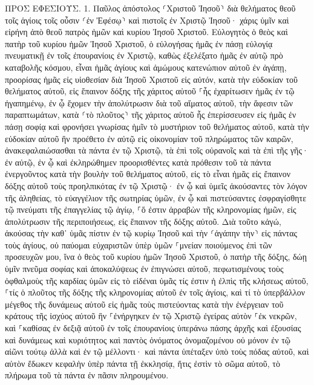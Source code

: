 \documentclass[twoside, 9pt]{extreport}
\begin{document}
ΠΡΟΣ ΕΦΕΣΙΟΥΣ.
1.
Παῦλος ἀπόστολος ⸂Χριστοῦ Ἰησοῦ⸃ διὰ θελήματος θεοῦ τοῖς ἁγίοις τοῖς οὖσιν ⸂ἐν Ἐφέσῳ⸃ καὶ πιστοῖς ἐν Χριστῷ Ἰησοῦ· 
χάρις ὑμῖν καὶ εἰρήνη ἀπὸ θεοῦ πατρὸς ἡμῶν καὶ κυρίου Ἰησοῦ Χριστοῦ. 
Εὐλογητὸς ὁ θεὸς καὶ πατὴρ τοῦ κυρίου ἡμῶν Ἰησοῦ Χριστοῦ, ὁ εὐλογήσας ἡμᾶς ἐν πάσῃ εὐλογίᾳ πνευματικῇ ἐν τοῖς ἐπουρανίοις ἐν Χριστῷ, 
καθὼς ἐξελέξατο ἡμᾶς ἐν αὐτῷ πρὸ καταβολῆς κόσμου, εἶναι ἡμᾶς ἁγίους καὶ ἀμώμους κατενώπιον αὐτοῦ ἐν ἀγάπῃ, 
προορίσας ἡμᾶς εἰς υἱοθεσίαν διὰ Ἰησοῦ Χριστοῦ εἰς αὐτόν, κατὰ τὴν εὐδοκίαν τοῦ θελήματος αὐτοῦ, 
εἰς ἔπαινον δόξης τῆς χάριτος αὐτοῦ ⸀ἧς ἐχαρίτωσεν ἡμᾶς ἐν τῷ ἠγαπημένῳ, 
ἐν ᾧ ἔχομεν τὴν ἀπολύτρωσιν διὰ τοῦ αἵματος αὐτοῦ, τὴν ἄφεσιν τῶν παραπτωμάτων, κατὰ ⸂τὸ πλοῦτος⸃ τῆς χάριτος αὐτοῦ 
ἧς ἐπερίσσευσεν εἰς ἡμᾶς ἐν πάσῃ σοφίᾳ καὶ φρονήσει 
γνωρίσας ἡμῖν τὸ μυστήριον τοῦ θελήματος αὐτοῦ, κατὰ τὴν εὐδοκίαν αὐτοῦ ἣν προέθετο ἐν αὐτῷ 
εἰς οἰκονομίαν τοῦ πληρώματος τῶν καιρῶν, ἀνακεφαλαιώσασθαι τὰ πάντα ἐν τῷ Χριστῷ, τὰ ἐπὶ τοῖς οὐρανοῖς καὶ τὰ ἐπὶ τῆς γῆς· ἐν αὐτῷ, 
ἐν ᾧ καὶ ἐκληρώθημεν προορισθέντες κατὰ πρόθεσιν τοῦ τὰ πάντα ἐνεργοῦντος κατὰ τὴν βουλὴν τοῦ θελήματος αὐτοῦ, 
εἰς τὸ εἶναι ἡμᾶς εἰς ἔπαινον δόξης αὐτοῦ τοὺς προηλπικότας ἐν τῷ Χριστῷ· 
ἐν ᾧ καὶ ὑμεῖς ἀκούσαντες τὸν λόγον τῆς ἀληθείας, τὸ εὐαγγέλιον τῆς σωτηρίας ὑμῶν, ἐν ᾧ καὶ πιστεύσαντες ἐσφραγίσθητε τῷ πνεύματι τῆς ἐπαγγελίας τῷ ἁγίῳ, 
⸀ὅ ἐστιν ἀρραβὼν τῆς κληρονομίας ἡμῶν, εἰς ἀπολύτρωσιν τῆς περιποιήσεως, εἰς ἔπαινον τῆς δόξης αὐτοῦ. 
Διὰ τοῦτο κἀγώ, ἀκούσας τὴν καθ᾽ ὑμᾶς πίστιν ἐν τῷ κυρίῳ Ἰησοῦ καὶ τὴν ⸂ἀγάπην τὴν⸃ εἰς πάντας τοὺς ἁγίους, 
οὐ παύομαι εὐχαριστῶν ὑπὲρ ὑμῶν ⸀μνείαν ποιούμενος ἐπὶ τῶν προσευχῶν μου, 
ἵνα ὁ θεὸς τοῦ κυρίου ἡμῶν Ἰησοῦ Χριστοῦ, ὁ πατὴρ τῆς δόξης, δώῃ ὑμῖν πνεῦμα σοφίας καὶ ἀποκαλύψεως ἐν ἐπιγνώσει αὐτοῦ, 
πεφωτισμένους τοὺς ὀφθαλμοὺς τῆς καρδίας ὑμῶν εἰς τὸ εἰδέναι ὑμᾶς τίς ἐστιν ἡ ἐλπὶς τῆς κλήσεως αὐτοῦ, ⸀τίς ὁ πλοῦτος τῆς δόξης τῆς κληρονομίας αὐτοῦ ἐν τοῖς ἁγίοις, 
καὶ τί τὸ ὑπερβάλλον μέγεθος τῆς δυνάμεως αὐτοῦ εἰς ἡμᾶς τοὺς πιστεύοντας κατὰ τὴν ἐνέργειαν τοῦ κράτους τῆς ἰσχύος αὐτοῦ 
ἣν ⸀ἐνήργηκεν ἐν τῷ Χριστῷ ἐγείρας αὐτὸν ⸀ἐκ νεκρῶν, καὶ ⸀καθίσας ἐν δεξιᾷ αὐτοῦ ἐν τοῖς ἐπουρανίοις 
ὑπεράνω πάσης ἀρχῆς καὶ ἐξουσίας καὶ δυνάμεως καὶ κυριότητος καὶ παντὸς ὀνόματος ὀνομαζομένου οὐ μόνον ἐν τῷ αἰῶνι τούτῳ ἀλλὰ καὶ ἐν τῷ μέλλοντι· 
καὶ πάντα ὑπέταξεν ὑπὸ τοὺς πόδας αὐτοῦ, καὶ αὐτὸν ἔδωκεν κεφαλὴν ὑπὲρ πάντα τῇ ἐκκλησίᾳ, 
ἥτις ἐστὶν τὸ σῶμα αὐτοῦ, τὸ πλήρωμα τοῦ τὰ πάντα ἐν πᾶσιν πληρουμένου. 
\end{document}
